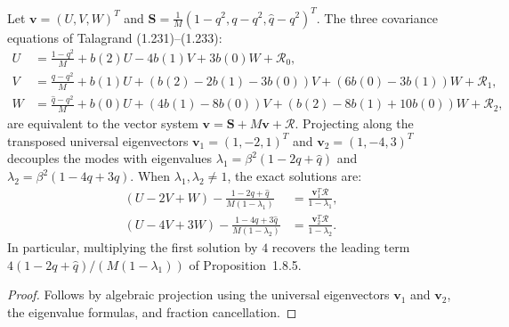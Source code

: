 \begin{theorem}
\label{thm:sg-tal:at-covariance-equations}
  \leanok
{}
Let $\mathbf{v} = (U, V, W)^T$ and $\mathbf{S} = \frac{1}{M}(1 - q^2, q - q^2, \hat{q} - q^2)^T$.
The three covariance equations of Talagrand (1.231)--(1.233):
\begin{align*}
U &= \frac{1 - q^2}{M} + b(2) U - 4 b(1) V + 3 b(0) W + \mathcal{R}_0, \\
V &= \frac{q - q^2}{M} + b(1) U + (b(2) - 2 b(1) - 3 b(0)) V + (6 b(0) - 3 b(1)) W + \mathcal{R}_1, \\
W &= \frac{\hat{q} - q^2}{M} + b(0) U + (4 b(1) - 8 b(0)) V + (b(2) - 8 b(1) + 10 b(0)) W + \mathcal{R}_2,
\end{align*}
are equivalent to the vector system $\mathbf{v} = \mathbf{S} + M \mathbf{v} + \boldsymbol{\mathcal{R}}$.
Projecting along the transposed universal eigenvectors $\mathbf{v}_1 = (1, -2, 1)^T$ and $\mathbf{v}_2 = (1, -4, 3)^T$ decouples the modes with eigenvalues $\lambda_1 = \beta^2(1 - 2q + \hat{q})$ and $\lambda_2 = \beta^2(1 - 4q + 3\hat{q})$. When $\lambda_1, \lambda_2 \ne 1$, the exact solutions are:
\begin{align*}
(U - 2 V + W) - \frac{1 - 2q + \hat{q}}{M (1 - \lambda_1)} &= \frac{\mathbf{v}_1^T \boldsymbol{\mathcal{R}}}{1 - \lambda_1}, \\
(U - 4 V + 3 W) - \frac{1 - 4q + 3\hat{q}}{M (1 - \lambda_2)} &= \frac{\mathbf{v}_2^T \boldsymbol{\mathcal{R}}}{1 - \lambda_2}.
\end{align*}
In particular, multiplying the first solution by $4$ recovers the leading term $4 (1 - 2q + \hat{q}) / (M (1 - \lambda_1))$ of Proposition~1.8.5.
\end{theorem}
\begin{proof}
  \leanok
Follows by algebraic projection using the universal eigenvectors $\mathbf{v}_1$ and $\mathbf{v}_2$, the eigenvalue formulas, and fraction cancellation.
\end{proof}

